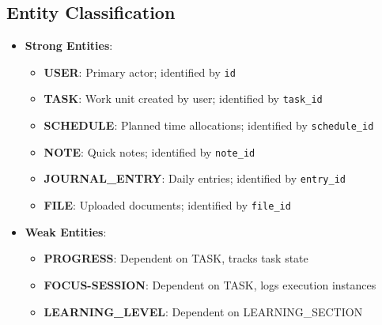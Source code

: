     \subsection{Entity Classification}
    \begin{itemize}
        \item \textbf{Strong Entities}:
        \begin{itemize}
            \item \textbf{USER}: Primary actor; identified by \texttt{id}
            \item \textbf{TASK}: Work unit created by user; identified by \texttt{task\_id}
            \item \textbf{SCHEDULE}: Planned time allocations; identified by \texttt{schedule\_id}
            \item \textbf{NOTE}: Quick notes; identified by \texttt{note\_id}
            \item \textbf{JOURNAL\_ENTRY}: Daily entries; identified by \texttt{entry\_id}
            \item \textbf{FILE}: Uploaded documents; identified by \texttt{file\_id}
        \end{itemize}
        \item \textbf{Weak Entities}:
        \begin{itemize}
            \item \textbf{PROGRESS}: Dependent on TASK, tracks task state
            \item \textbf{FOCUS-SESSION}: Dependent on TASK, logs execution instances
            \item \textbf{LEARNING\_LEVEL}: Dependent on LEARNING\_SECTION
        \end{itemize}
    \end{itemize}


